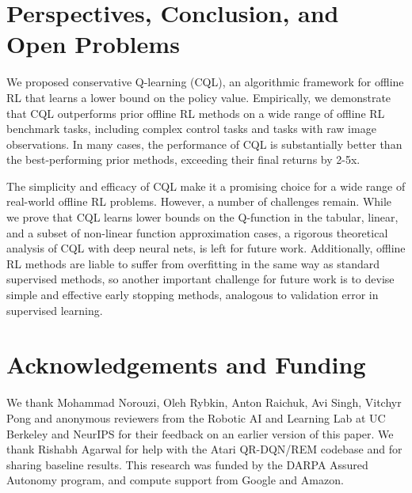 \documentclass[../thesis.tex]{subfiles}
\begin{document}





\section{Perspectives, Conclusion, and Open Problems}
We proposed conservative Q-learning (CQL), an algorithmic framework for offline RL that learns a lower bound on the policy value.
Empirically, we demonstrate that CQL outperforms prior offline RL methods on a wide range of offline RL benchmark tasks, including complex control tasks and tasks with raw image observations. In many cases, the performance of CQL is substantially better than the best-performing prior methods, exceeding their final returns by 2-5x.

The simplicity and efficacy of CQL make it a promising choice for a wide range of real-world offline RL problems. However, a number of challenges remain. While we prove that CQL learns lower bounds on the Q-function in the tabular, linear, and a subset of non-linear function approximation cases, a rigorous theoretical analysis of CQL with deep neural nets, is left for future work. Additionally, offline RL methods are liable to suffer from overfitting in the same way as standard supervised methods, so another important challenge for future work is to devise simple and effective early stopping methods, analogous to validation error in supervised learning.

\section*{Acknowledgements and Funding}
We thank Mohammad Norouzi, Oleh Rybkin, Anton Raichuk, Avi Singh, Vitchyr Pong and anonymous reviewers from the Robotic AI and Learning Lab at UC Berkeley and NeurIPS for their feedback on an earlier version of this paper. We thank Rishabh Agarwal for help with the Atari QR-DQN/REM codebase and for sharing baseline results. This research was funded by the DARPA Assured Autonomy program, and compute support from Google and Amazon.
\end{document}
